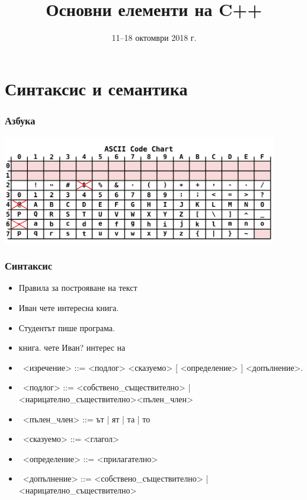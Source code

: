 \documentclass{beamer}
\title{Основни елементи на C++}
\date{11--18 октомври 2018 г.}
\begin{document}
\begin{frame}
  \titlepage
\end{frame}

\section{Синтаксис и семантика}

\begin{frame}
  \frametitle{Азбука}
  \begin{center}
    \includegraphics[width=0.9\textwidth]{images/ascii.pdf}\\[2em]
  \end{center}
  \wiki
\end{frame}

\begin{frame}
  \frametitle{Синтаксис}
  \begin{itemize}[<+->]
  \item Правила за построяване на текст
  \item \alert{Иван чете интересна книга.}
  \item \alert{Студентът пише програма.}
  \item \alert{книга. чете Иван? интерес на}
  \item\ <изречение> ::= <подлог> <сказуемо> [ <определение> ] <допълнение>\alert.
  \item\ <подлог> ::= <собствено\_съществително> | <нарицателно\_съществително><пълен\_член>
  \item\ <пълен\_член> ::= \alert{ът} | \alert{ят} | \alert{та} | \alert{то}
  \item\ <сказуемо> ::= <глагол>
  \item\ <определение> ::= <прилагателно>
  \item\ <допълнение> ::= <собствено\_съществително> | <нарицателно\_съществително>
  \end{itemize}
\end{frame}
\end{document}
